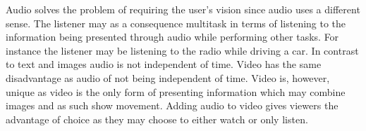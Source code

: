Audio solves the problem of requiring the user's vision since audio uses a different sense. The listener may as a consequence multitask in terms of listening to the information being presented through audio while performing other tasks. For instance the listener may be listening to the radio while driving a car. In contrast to text and images audio is not independent of time. Video has the same disadvantage as audio of not being independent of time. Video is, however, unique as video is the only form of presenting information which may combine images and as such show movement. Adding audio to video gives viewers the advantage of choice as they may choose to either watch or only listen.